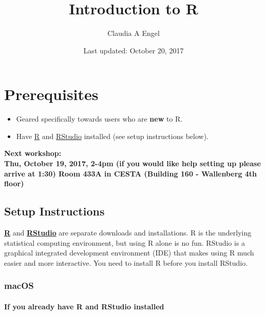 \documentclass[]{book}
\title{Introduction to R}
\author{Claudia A Engel}
\date{Last updated: October 20, 2017}
\providecommand{\tightlist}{%
  \setlength{\itemsep}{0pt}\setlength{\parskip}{0pt}}
\theoremstyle{definition}
\theoremstyle{definition}
\theoremstyle{remark}
\begin{document}
\maketitle

{
\setcounter{tocdepth}{1}
\tableofcontents
}
\chapter*{Prerequisites}\label{prerequisites}

\begin{itemize}
\tightlist
\item
  Geared specifically towards users who are \textbf{new} to R.\\
\item
  Have \href{https://cran.r-project.org/}{R} and
  \href{https://www.rstudio.com/}{RStudio} installed (see setup
  instructions below).
\end{itemize}

\textbf{Next workshop:\\
Thu, October 19, 2017, 2-4pm (if you would like help setting up please
arrive at 1:30) Room 433A in CESTA (Building 160 - Wallenberg 4th
floor)}

\section*{Setup Instructions}\label{setup-instructions}

\href{https://cran.r-project.org/}{\textbf{R}} and
\href{https://www.rstudio.com/}{\textbf{RStudio}} are separate downloads
and installations. R is the underlying statistical computing
environment, but using R alone is no fun. RStudio is a graphical
integrated development environment (IDE) that makes using R much easier
and more interactive. You need to install R before you install RStudio.

\subsection*{macOS}\label{macos}

\subsubsection*{If you already have R and RStudio
installed}\label{if-you-already-have-r-and-rstudio-installed}
\end{document}
